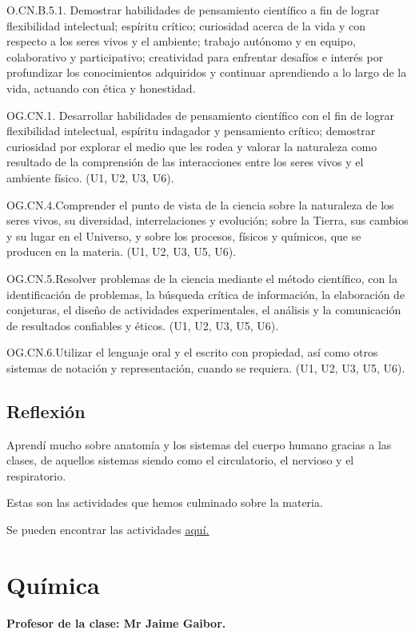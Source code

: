 \documentclass[a4paper, 12pt]{article}
\begin{document}
O.CN.B.5.1. Demostrar habilidades de pensamiento científico a fin de lograr flexibilidad intelectual; espíritu crítico; curiosidad acerca de la vida y con respecto a los seres vivos y el ambiente; trabajo autónomo y en equipo, colaborativo y participativo; creatividad para enfrentar desafíos e interés por profundizar los conocimientos adquiridos y continuar aprendiendo a lo largo de la vida, actuando con ética y honestidad.

OG.CN.1. Desarrollar habilidades de pensamiento científico con el fin de lograr flexibilidad intelectual, espíritu indagador y pensamiento crítico; demostrar curiosidad por explorar el medio que les rodea y valorar la naturaleza como resultado de la comprensión de las interacciones entre los seres vivos y el ambiente físico. (U1, U2, U3, U6).

OG.CN.4.Comprender el punto de vista de la ciencia sobre la naturaleza de los seres vivos, su diversidad, interrelaciones y evolución; sobre la Tierra, sus cambios y su lugar en el Universo, y sobre los procesos, físicos y químicos, que se producen en la materia. (U1, U2, U3, U5, U6).

OG.CN.5.Resolver problemas de la ciencia mediante el método científico, con la identificación de problemas, la búsqueda crítica de información, la elaboración de conjeturas, el diseño de actividades experimentales, el análisis y la comunicación de resultados confiables y éticos. (U1, U2, U3, U5, U6).

OG.CN.6.Utilizar el lenguaje oral y el escrito con propiedad, así como otros sistemas de notación y representación, cuando se requiera. (U1, U2, U3, U5, U6).

\subsection{Reflexión}
Aprendí mucho sobre anatomía y los sistemas del cuerpo humano gracias a las clases, de aquellos sistemas siendo como el circulatorio, el nervioso y el respiratorio.

Estas son las actividades que hemos culminado sobre la materia.

Se pueden encontrar las actividades \href{https://drive.google.com/drive/folders/1YKD8CT8OZtmeYhkY7_T-5Bcr-CvnnMNm?usp=sharing}{\underline{aquí.}}

\section{Química}
\textbf{Profesor de la clase: Mr Jaime Gaibor.}
\end{document}
